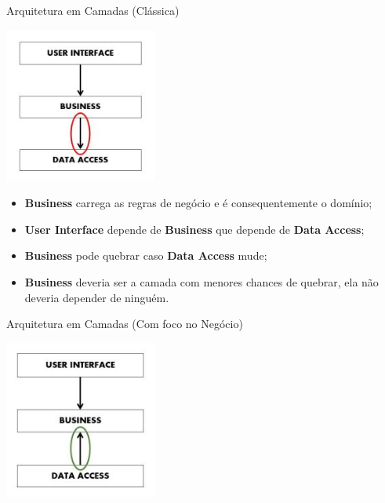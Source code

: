 \documentclass[aspectratio=169]{beamer}
\begin{document}
\begin{frame}{Arquitetura em Camadas (Clássica)}	
	\begin{multicols}{2}		
		\begin{center}
			\includegraphics[width=5cm]{imgs/layered-architecture}
		\end{center}
		\begin{itemize}	
			\item \textbf{Business} carrega as regras de negócio e é consequentemente o domínio;
			\item \textbf{User Interface} depende de \textbf{Business} que depende de \textbf{Data Access};
			\item \textbf{Business} pode quebrar caso \textbf{Data Access} mude;
			\item \textbf{Business} deveria ser a camada com menores chances de quebrar, ela não deveria depender de ninguém.
		\end{itemize}
	\end{multicols}
\end{frame}

\begin{frame}{Arquitetura em Camadas (Com foco no Negócio)}			
	\begin{center}
		\includegraphics[width=5cm]{imgs/dip-layered-architecture}
	\end{center}
\end{frame}
\end{document}
